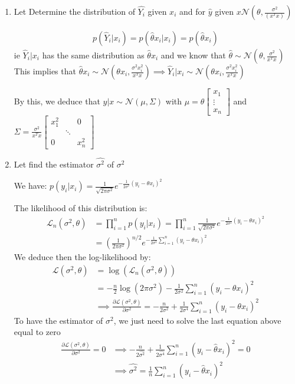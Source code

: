 \documentclass[12pt,a4paper]{article}
\begin{document}
\begin{enumerate}
\item Let Determine the distribution of $\widehat{Y_{i}}$ given $x_{i}$ and for $\widehat{y}$ given $x\mathcal{N}(\theta,\frac{\sigma^{2} }{(x^{T}x)^{}})$

\begin{align}
 p(\widehat{Y}_{i}|x_{i})=p(\hat{\theta}x_{i}|x_{i})=p(\hat\theta x_{i})
\end{align}
 ie $\widehat{Y}_{i}|x_{i}$ has the same distribution as $\hat\theta x_{i}$ and we know that $\hat{\theta}\sim\mathcal{N}(\theta,\frac{\sigma^{2} }{x^{T}x^{}})$ This implies that $\hat{\theta}x_{i}\sim\mathcal{N}(\theta x_{i},\frac{\sigma^{2}x_{i}^{2}}{x^{T}x^{}})\implies\widehat{Y}_{i}|x_{i}\sim\mathcal{N}(\theta x_{i},\frac{\sigma^{2}x_{i}^{2}}{x^{T}x^{}}) $

By this, we deduce that $\widehat{y}|x\sim\mathcal{N}(\mu,\Sigma)$ with $\mu=\theta\begin{bmatrix}
	x_{1}\\
	\vdots\\
	x_{n}
\end{bmatrix}$ and $\Sigma=\frac{\sigma^{2}}{x^{T}x}\begin{bmatrix}
x_{1}^{2}&&0\\
&\ddots&\\
0&&x_{n}^{2}
\end{bmatrix}$


\item Let find the estimator $\widehat{\sigma^{2}}$ of $\sigma^{2}$

We have: $p(y_{i}|x_{i})=\frac{1}{\sqrt{2\pi\sigma^{2}}}e^{-\frac{1}{2\sigma^{2}}(y_{i}-\theta x_{i})^{2}}$

The likelihood of this distribution is:
\begin{align*}
\mathcal{L}_{n}(\sigma^{2},\theta)&=\prod_{i=1}^{n}p(y_{i}|x_{i}) = \prod_{i=1}^{n}\frac{1}{\sqrt{2\pi\sigma^{2}}}e^{-\frac{1}{2\sigma^{2}}(y_{i}-\theta x_{i})^{2}}\\
& = \left(\frac{1}{2\pi\sigma^{2}}\right)^{n/2}e^{-\frac{1}{2\sigma^{2}}\sum_{i=1}^{n}(y_{i}-\theta x_{i})^{2}}
\end{align*}
We deduce then the log-likelihood by:
\begin{align*}
	\mathscr{L} (\sigma^{2},\theta)& = \log(\mathcal{L}_{n}(\sigma^{2},\theta))\\
	& = -\frac{n}{2}\log(2\pi\sigma^{2})-\frac{1}{2\sigma^{2}}\sum_{i=1}^{n}(y_{i}-\theta x_{i})^{2}\\
	&\implies \frac{\partial \mathscr{L} (\sigma^{2},\theta) }{\partial \sigma^{2}} = -\frac{n}{2\sigma^{2}}+\frac{1}{2\sigma^{4}}\sum_{i=1}^{n}(y_{i}-\theta x_{i})^{2}
\end{align*}
To have the estimator of $\sigma^{2}$, we just need to solve the last equation above equal to zero
\begin{align*}
	\frac{\partial \mathscr{L} (\sigma^{2},\theta) }{\partial \sigma^{2}} =0&\implies -\frac{n}{2\widehat{\sigma^{2}}}+\frac{1}{2\widehat{\sigma^{4}}}\sum_{i=1}^{n}(y_{i}-\widehat{\theta} x_{i})^{2}=0\\
	&\implies \widehat{\sigma^{2}} = \frac{1}{n}\sum_{i=1}^{n}(y_{i}-\widehat{\theta} x_{i})^{2}
\end{align*}

\end{enumerate}
\end{document}
